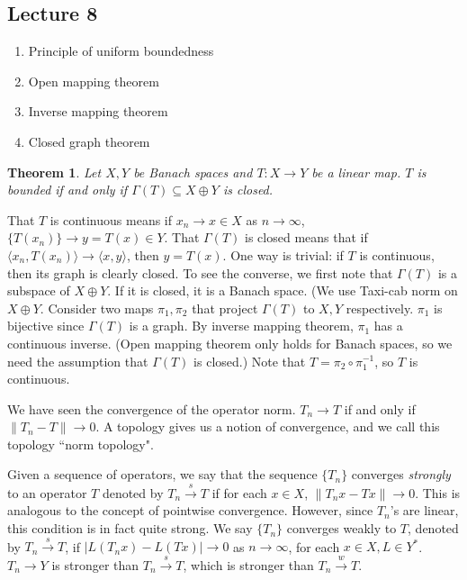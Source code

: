 \documentclass[12pt]{article}
\theoremstyle{plain}
\newtheorem{theorem}[equation]{Theorem}
\theoremstyle{definition}
\theoremstyle{named}
\newcommand{\<}{\langle}
\renewcommand{\>}{\rangle}
\begin{document}
\subsection*{Lecture 8}

\begin{enumerate}
\item Principle of uniform boundedness
\item Open mapping theorem
\item Inverse mapping theorem
\item Closed graph theorem 
\end{enumerate}

\begin{theorem}
\label{closedgraph}
Let $X, Y$ be Banach spaces and $T : X \to Y$ be a linear map. $T$ is bounded if and only if $\Gamma(T) \subseteq X \oplus Y$ is closed. 
\end{theorem}
That $T$ is continuous means if $x_n \to x \in X$ as $n \to \infty$, $\{ T(x_n) \} \to y = T(x) \in Y$. That $\Gamma(T)$ is closed means that if $\< x_n, T(x_n) \> \to \< x, y \>$, then $y = T(x)$. One way is trivial: if $T$ is continuous, then its graph is clearly closed. To see the converse, we first note that $\Gamma(T)$ is a subspace of $X \oplus Y$. If it is closed, it is a Banach space. (We use Taxi-cab norm on $X \oplus Y$. Consider two maps $\pi_1, \pi_2$ that project $\Gamma(T)$ to $X, Y$ respectively. $\pi_1$ is bijective since $\Gamma(T)$ is a graph. By inverse mapping theorem, $\pi_1$ has a continuous inverse. (Open mapping theorem only holds for Banach spaces, so we need the assumption that $\Gamma(T)$ is closed.) Note that $T = \pi_2 \circ \pi_1^{-1}$, so $T$ is continuous. 

We have seen the convergence of the operator norm. $T_n \to T$ if and only if $\| T_n - T \| \to 0$. A topology gives us a notion of convergence, and we call this topology ``norm topology". 

Given a sequence of operators, we say that the sequence $\{ T_n \}$ converges \textit{strongly} to an operator $T$ denoted by $T_n \stackrel{s}{\to} T$ if for each $x \in X$, $\| T_n x - T x \| \to 0$. This is analogous to the concept of pointwise convergence. However, since $T_n$'s are linear, this condition is in fact quite strong. We say $\{ T_n \}$ converges weakly to $T$, denoted by $T_n \stackrel{s}{\to} T$, if $| L(T_n x) - L(Tx) | \to 0$ as $n \to \infty$, for each $x \in X, L \in Y^*$. 
$T_n \to Y$ is stronger than $T_n \stackrel{s}{\to} T$, which is stronger than $T_n \stackrel{w}{\to} T$. 
\end{document}
